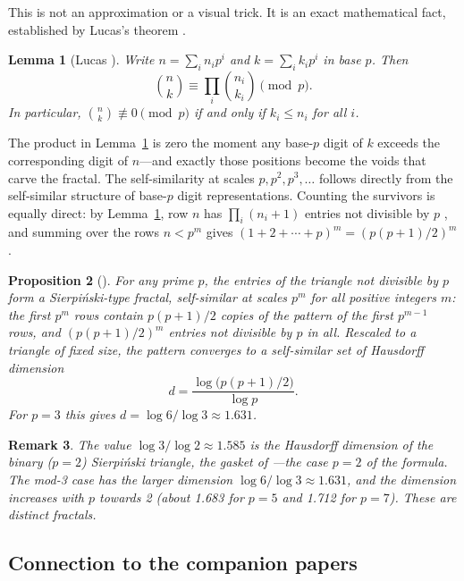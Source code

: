 \documentclass[11pt]{amsart}
\newtheorem{lemma}{Lemma}[section]
\newtheorem{proposition}[lemma]{Proposition}
\newtheorem{remark}[lemma]{Remark}
\begin{document}
This is not an approximation or a visual trick. It is an exact mathematical fact, established by Lucas's theorem \cite{lucas1878}.

\begin{lemma}[Lucas \cite{lucas1878}]\label{lem:lucas}
Write $n = \sum_i n_i p^i$ and $k = \sum_i k_i p^i$ in base $p$. Then
\[
\binom{n}{k} \equiv \prod_i \binom{n_i}{k_i} \pmod{p}.
\]
In particular, $\binom{n}{k} \not\equiv 0 \pmod{p}$ if and only if $k_i \leq n_i$ for all $i$.
\end{lemma}

The product in Lemma~\ref{lem:lucas} is zero the moment any base-$p$ digit of $k$ exceeds the corresponding digit of $n$---and exactly those positions become the voids that carve the fractal. The self-similarity at scales $p, p^2, p^3, \ldots$ follows directly from the self-similar structure of base-$p$ digit representations. Counting the survivors is equally direct: by Lemma~\ref{lem:lucas}, row $n$ has $\prod_i (n_i+1)$ entries not divisible by $p$ \cite{fine1947}, and summing over the rows $n < p^m$ gives $(1+2+\cdots+p)^m = (p(p+1)/2)^m$.

\begin{proposition}[\cite{wolfram1984,reiter1993}]\label{prop:fractal}
For any prime $p$, the entries of the triangle not divisible by $p$ form a Sierpiński-type fractal, self-similar at scales $p^m$ for all positive integers $m$: the first $p^m$ rows contain $p(p+1)/2$ copies of the pattern of the first $p^{m-1}$ rows, and $(p(p+1)/2)^m$ entries not divisible by $p$ in all. Rescaled to a triangle of fixed size, the pattern converges to a self-similar set of Hausdorff dimension
\[
d = \frac{\log\bigl(p(p+1)/2\bigr)}{\log p}.
\]
For $p=3$ this gives $d = \log 6 / \log 3 \approx 1.631$.
\end{proposition}

\begin{remark}
The value $\log 3 / \log 2 \approx 1.585$ is the Hausdorff dimension of the binary ($p=2$) Sierpiński triangle, the gasket of \cite{sierpinski1915}---the case $p=2$ of the formula. The mod-3 case has the larger dimension $\log 6 / \log 3 \approx 1.631$, and the dimension increases with $p$ towards 2 (about 1.683 for $p=5$ and 1.712 for $p=7$). These are distinct fractals.
\end{remark}

\subsection{Connection to the companion papers}
\end{document}
